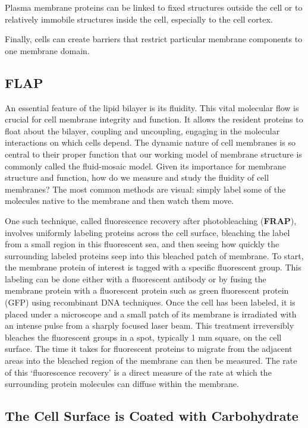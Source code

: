 Plasma membrane proteins can be linked to fixed structures outside the cell
or to relatively immobile structures inside the cell, especially to the cell cortex.

Finally, cells can create barriers that restrict particular membrane components
to one membrane domain.

\subsection{FLAP}

An essential feature of the lipid bilayer is its fluidity. This
vital molecular flow is crucial for cell membrane integrity and function.
It allows the resident proteins to float
about the bilayer, coupling and uncoupling, engaging in
the molecular interactions on which cells depend. The
dynamic nature of cell membranes is so central to their
proper function that our working model of membrane
structure is commonly called the fluid-mosaic model.
Given its importance for membrane structure and function,
how do we measure and study the fluidity of cell
membranes? The most common methods are visual:
simply label some of the molecules native to the membrane and then watch them move.

One such technique, called fluorescence recovery after
photobleaching (\textbf{FRAP}), involves uniformly labeling proteins
across the cell surface, bleaching the label from a
small region in this fluorescent sea, and then seeing how
quickly the surrounding labeled proteins seep into this
bleached patch of membrane. To start, the membrane
protein of interest is tagged with a specific fluorescent
group. This labeling can be done either with a fluorescent
antibody or by fusing the membrane protein with
a fluorescent protein such as green fluorescent protein
(GFP) using recombinant DNA techniques.
Once the cell has been labeled, it is placed under a
microscope and a small patch of its membrane is irradiated
with an intense pulse from a sharply focused laser
beam. This treatment irreversibly bleaches the fluorescent
groups in a spot, typically 1 mm square, on the cell surface.
The time it takes for fluorescent
proteins to migrate from the adjacent areas into the
bleached region of the membrane can then be measured. The rate of this ‘fluorescence recovery’ is a direct
measure of the rate at which the surrounding protein
molecules can diffuse within the membrane.

\subsection{The Cell Surface is Coated with Carbohydrate}

